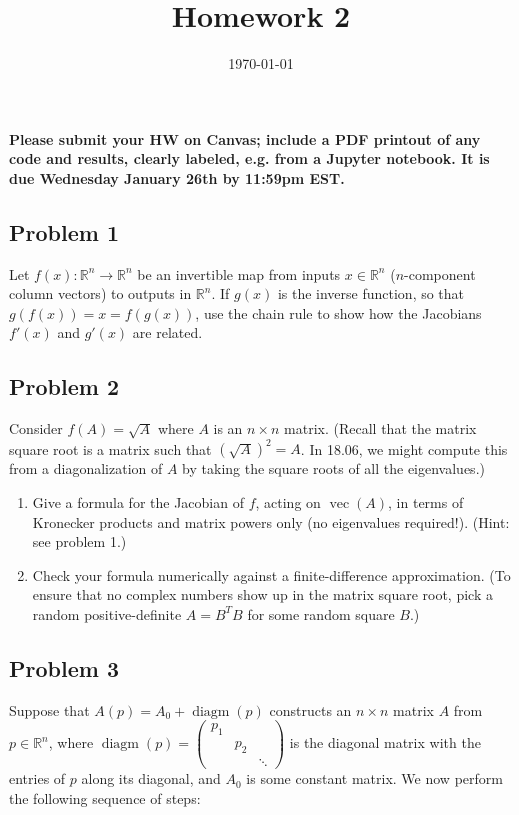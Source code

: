 \documentclass[10pt,oneside]{article}
\author{}
\title{Homework 2}
\date{\today}
\newcommand{\vecm}{\operatorname{vec}}
\newcommand{\diagm}{\operatorname{diagm}}
\begin{document}
\maketitle
\thispagestyle{fancy}

{\bf Please submit your HW on Canvas; include a PDF printout of any code and results, clearly labeled, e.g. from a Jupyter notebook.  It is due Wednesday January 26th by 11:59pm EST.  }

\subsection*{Problem 1}

Let $f(x): \mathbb{R}^n \to \mathbb{R}^n$ be an invertible map from inputs $x \in \mathbb{R}^n$ ($n$-component column vectors) to outputs in $\mathbb{R}^n$.   If $g(x)$ is the inverse function, so that $g(f(x)) = x = f(g(x))$, use the chain rule to show how the Jacobians $f'(x)$ and $g'(x)$ are related.

\subsection*{Problem 2}

Consider $f(A) = \sqrt{A}$ where $A$ is an $n\times n$ matrix.   (Recall that the matrix square root is a matrix such that $(\sqrt{A})^2 = A$.   In 18.06, we might compute this from a diagonalization of $A$ by taking the square roots of all the eigenvalues.)

\begin{enumerate}[label=\alph*)]
    \item  Give a formula for the Jacobian of $f$, acting on $\vecm(A)$, in terms of Kronecker products and matrix powers only (no eigenvalues required!).  (Hint: see problem 1.)

    \item Check your formula numerically against a finite-difference approximation.  (To ensure that no complex numbers show up in the matrix square root, pick a random positive-definite $A = B^T B$ for some random square $B$.)
\end{enumerate}

\subsection*{Problem 3}

Suppose that $A(p) = A_0 + \diagm(p)$ constructs an $n\times n$ matrix $A$ from $p \in \mathbb{R}^n$, where $\diagm(p) = \begin{pmatrix} p_1 & & \\ & p_2 & \\ & & \ddots \end{pmatrix}$ is the diagonal matrix with the entries of $p$ along its diagonal, and $A_0$ is some constant matrix.   We now perform the following sequence of steps:
\end{document}
